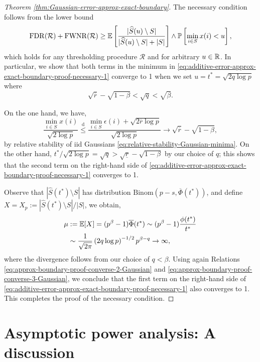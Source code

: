 \begin{proof}[Theorem \ref{thm:Gaussian-error-approx-exact-boundary}]
The necessary condition follows from the lower bound
\begin{equation} \label{eq:additive-error-approx-exact-boundary-proof-necessary-1}
    \mathrm{FDR}(\mathcal{R}) + \mathrm{FWNR}(\mathcal{R}) \ge {\mathbb E}\left[\frac{|\widehat{S}(u)\setminus S|}{|\widehat{S}(u)\setminus S| + |S|}\right] \wedge 
    {\mathbb P}\left[\min_{i\in S}x(i)<u\right],
\end{equation}
which holds for any thresholding procedure $\mathcal{R}$ and for arbitrary $u\in\mathbb R$.
In particular, we show that both terms in the minimum in \eqref{eq:additive-error-approx-exact-boundary-proof-necessary-1} converge to 1 when we set $u=t^*=\sqrt{2q\log{p}}$ where 
\begin{equation}
\sqrt{\overline{r}}-\sqrt{1-\beta}<\sqrt{q}<\sqrt{\beta}.
\end{equation}

On the one hand, we have,
$$
\frac{\min_{i\in S}x(i)}{\sqrt{2\log{p}}} 
\stackrel{\mathrm{d}}{\le} \frac{\min_{i\in S}\epsilon(i)+\sqrt{2\overline{r}\log{p}}}{\sqrt{2\log{p}}} 
\to \sqrt{\overline{r}}-\sqrt{1-\beta},
$$
by relative stability of iid Gaussians \eqref{eq:relative-stability-Gaussian-minima}. On the other hand, ${t^*}/{\sqrt{2\log{p}}}=\sqrt{q}>\sqrt{\underline{r}}-\sqrt{1-\beta}$ by our choice of ${q}$;
this shows that the second term on the right-hand side of \eqref{eq:additive-error-approx-exact-boundary-proof-necessary-1} converges to 1.

Observe that $|\widehat{S}(t^*)\setminus{S}|$ has distribution $\text{Binom}(p-s, \overline{\Phi}(t^*))$, and define $X = X_p := {|\widehat{S}(t^*)\setminus{S}|}/{|S|}$, we obtain,
\begin{align*}
    \mu &:= {\mathbb E}[X] = (p^\beta-1)\overline{\Phi}(t^*) 
    \sim (p^\beta-1)\frac{\phi(t^*)}{t^*} \\
    &\sim \frac{1}{\sqrt{2\pi}}\left(2q\log{p}\right)^{-1/2}p^{\beta-q}\to\infty,
\end{align*}
where the divergence follows from our choice of $q<\beta$.
Using again Relations \eqref{eq:approx-boundary-proof-converse-2-Gaussian} and \eqref{eq:approx-boundary-proof-converse-3-Gaussian}, we conclude that the first term on the right-hand side of \eqref{eq:additive-error-approx-exact-boundary-proof-necessary-1} also converges to 1.
This completes the proof of the necessary condition.
\end{proof}


\section{Asymptotic power analysis: A discussion}
\label{subsec:power-analysis}

